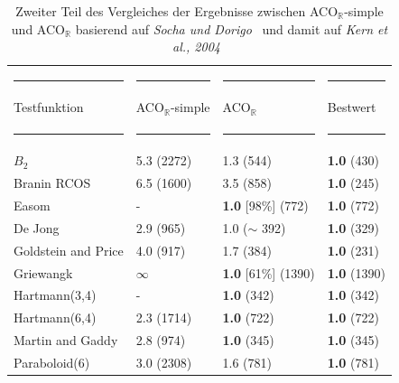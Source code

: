 \documentclass[fontsize=12, a4aper]{scrartcl}
\begin{document}
	\begin{table}[H]
		
		\fontsize{10pt}{12pt}
		
		\caption{Zweiter Teil des Vergleiches der Ergebnisse zwischen ACO\(_{\mathbb{R}}\)-simple und ACO\(_{\mathbb{R}}\) basierend auf \textit{Socha und Dorigo}~\cite{socha2008ant} und damit auf \textit{Kern et al., 2004}~\cite{kern2004learning}}
		
		\label{VerglelichACORundACORSimpleTeil2}
		
		\begin{tabularx}{\textwidth}{l|l|l|l}
			
			\rule{3,55cm}{0.4pt} & \rule{3,45cm}{0.4pt} & \rule{3,45cm}{0.4pt} & \rule{3,45cm}{0.4pt}\\
			
			Testfunktion & ACO\(_{\mathbb{R}}\)-simple & ACO\(_{\mathbb{R}}\) & Bestwert\\
			
			\rule{3,55cm}{0.4pt} & \rule{3,45cm}{0.4pt} & \rule{3,45cm}{0.4pt} & \rule{3,45cm}{0.4pt}\\
			
			\(B_2\) & 5.3 (2272) & 1.3 (544) & \textbf{1.0} (430)\\
			
			Branin RCOS & 6.5 (1600) & 3.5 (858) & \textbf{1.0} (245)\\
			
			Easom & - & \textbf{1.0} [98\%] (772) & \textbf{1.0} (772)\\
			
			De Jong & 2.9 (965) & 1.0 ($\sim$ 392) & \textbf{1.0} (329)\\
			
			Goldstein and Price & 4.0 (917) & 1.7 (384) & \textbf{1.0} (231)\\
			
			Griewangk & \(\infty\) & \textbf{1.0} [61\%] (1390) & \textbf{1.0} (1390)\\
			
			Hartmann(3,4) & - & \textbf{1.0} (342) & \textbf{1.0} (342)\\
			
			Hartmann(6,4) & 2.3 (1714) & \textbf{1.0} (722) & \textbf{1.0} (722)\\
			
			Martin and Gaddy & 2.8 (974) & \textbf{1.0} (345) & \textbf{1.0} (345)\\
			
			Paraboloid(6) & 3.0 (2308) & 1.6 (781) & \textbf{1.0} (781)\\
			

\end{tabularx}
\end{table}
\end{document}
